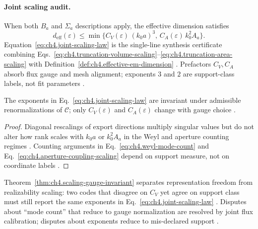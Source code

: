 \paragraph{Joint scaling audit.}
When both \(B_{a}\) and \(\Sigma_{a}\) descriptions apply, the effective dimension satisfies
\begin{equation}
\label{eq:ch4.joint-scaling-law}
d_{\mathrm{eff}}(\varepsilon)
\le
\min\big\{
C_{V}(\varepsilon)\,(k_{0}a)^{3},\,
C_{A}(\varepsilon)\,k_{0}^{2}A_{a}
\big\}.
\end{equation}
Equation~\eqref{eq:ch4.joint-scaling-law} is the single-line synthesis certificate combining
Eqs.~\eqref{eq:ch4.truncation-volume-scaling}--\eqref{eq:ch4.truncation-area-scaling} with
Definition~\ref{def:ch4.effective-em-dimension} \cite{harrington2001,devaney2004,hansen1988}. Prefactors \(C_{V},C_{A}\) absorb flux
gauge and mesh alignment; exponents \(3\) and \(2\) are support-class labels, not fit parameters \cite{stratton1941,jackson1999}.

\begin{theorem}
\label{thm:ch4.scaling-gauge-invariant}
The exponents in Eq.~\eqref{eq:ch4.joint-scaling-law} are invariant under admissible renormalizations of \(\mathcal{C}\); only
\(C_{V}(\varepsilon)\) and \(C_{A}(\varepsilon)\) change with gauge choice \cite{hansen1988,stratton1941,harrington2001}.
\end{theorem}
\begin{proof}
Diagonal rescalings of export directions multiply singular values but do not alter how rank scales with \(k_{0}a\) or \(k_{0}^{2}A_{a}\)
in the Weyl and aperture counting regimes \cite{hansen1988,stratton1941}. Counting arguments in
Eq.~\eqref{eq:ch4.weyl-mode-count} and Eq.~\eqref{eq:ch4.aperture-coupling-scaling} depend on support measure, not on coordinate labels
\cite{harrington2001,devaney2004,jackson1999}.
\end{proof}

Theorem~\ref{thm:ch4.scaling-gauge-invariant} separates representation freedom from realizability scaling: two codes that disagree on
\(C_{V}\) yet agree on support class must still report the same exponents in Eq.~\eqref{eq:ch4.joint-scaling-law}
\cite{hansen1988,collin2001}. Disputes about ``mode count'' that reduce to gauge normalization are resolved by joint flux calibration;
disputes about exponents reduce to mis-declared support \cite{stratton1941,harrington2001}.

